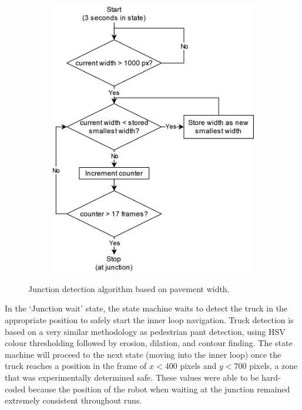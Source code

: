 \documentclass[titlepage, twocolumn]{article}
\begin{document}
\begin{figure}
\begin{center}
\begin{subfigure}{0.5\linewidth}
                        \includegraphics[width=\linewidth]{junctiondiagram.png}
                \label{fig:junctionalg}
                      \end{subfigure}
                    \centering\caption{Junction detection algorithm based on pavement width.}
                \end{center}
                \label{fig:junctiondetect}
            \end{figure}

            In the `Junction wait' state, the state machine waits to detect the truck in the appropriate position to safely start the inner loop navigation. Truck detection is based on a very similar methodology as pedestrian pant detection, using HSV colour thresholding followed by erosion, dilation, and contour finding. The state machine will proceed to the next state (moving into the inner loop) once the truck reaches a position in the frame of $x < 400$ pixels and $y<700 $ pixels, a zone that was experimentally determined safe. These values were able to be hard-coded because the position of the robot when waiting at the junction remained extremely consistent throughout runs. 
\end{document}

